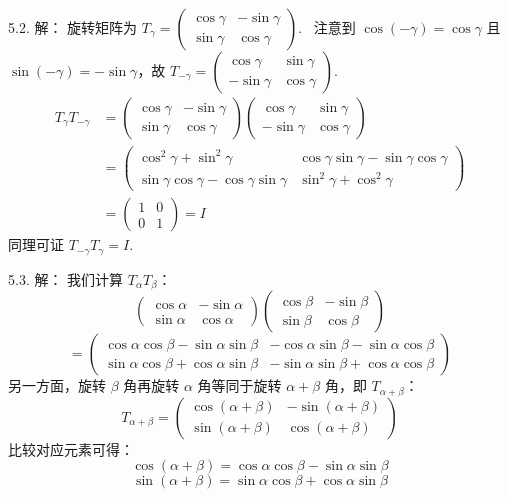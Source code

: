 \begin{exer}
5.2. 解：
旋转矩阵为 $T_\gamma = \begin{pmatrix} \cos\gamma & -\sin\gamma \\ \sin\gamma & \cos\gamma \end{pmatrix}$.~
注意到 $\cos(-\gamma) = \cos\gamma$ 且 $\sin(-\gamma) = -\sin\gamma$，故
$T_{-\gamma} = \begin{pmatrix} \cos\gamma & \sin\gamma \\ -\sin\gamma & \cos\gamma \end{pmatrix}$.~
$$
\begin{aligned}
T_\gamma T_{-\gamma} &= \begin{pmatrix} \cos\gamma & -\sin\gamma \\ \sin\gamma & \cos\gamma \end{pmatrix} \begin{pmatrix} \cos\gamma & \sin\gamma \\ -\sin\gamma & \cos\gamma \end{pmatrix} \\
&= \begin{pmatrix} \cos^2\gamma + \sin^2\gamma & \cos\gamma\sin\gamma - \sin\gamma\cos\gamma \\ \sin\gamma\cos\gamma - \cos\gamma\sin\gamma & \sin^2\gamma + \cos^2\gamma \end{pmatrix} \\
&= \begin{pmatrix} 1 & 0 \\ 0 & 1 \end{pmatrix} = I
\end{aligned}
$$
同理可证 $T_{-\gamma} T_\gamma = I$.~

5.3. 解：
我们计算 $T_\alpha T_\beta$：
$$
\begin{pmatrix} \cos\alpha & -\sin\alpha \\ \sin\alpha & \cos\alpha \end{pmatrix} \begin{pmatrix} \cos\beta & -\sin\beta \\ \sin\beta & \cos\beta \end{pmatrix}$$ $$
= \begin{pmatrix} \cos\alpha\cos\beta - \sin\alpha\sin\beta & -\cos\alpha\sin\beta - \sin\alpha\cos\beta \\ \sin\alpha\cos\beta + \cos\alpha\sin\beta & -\sin\alpha\sin\beta + \cos\alpha\cos\beta \end{pmatrix}
$$
另一方面，旋转 $\beta$ 角再旋转 $\alpha$ 角等同于旋转 $\alpha + \beta$ 角，即 $T_{\alpha+\beta}$：
$$
T_{\alpha+\beta} = \begin{pmatrix} \cos(\alpha+\beta) & -\sin(\alpha+\beta) \\ \sin(\alpha+\beta) & \cos(\alpha+\beta) \end{pmatrix}
$$
比较对应元素可得：
$$ \cos(\alpha+\beta) = \cos\alpha\cos\beta - \sin\alpha\sin\beta $$
$$ \sin(\alpha+\beta) = \sin\alpha\cos\beta + \cos\alpha\sin\beta $$


\end{exer}
